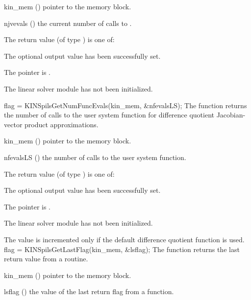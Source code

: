 {
  \begin{args}
  \item[kin\_mem] ()
    pointer to the {\kinsol} memory block.
  \item[njvevals] ()
    the current number of calls to .
  \end{args}
}
{
  The return value  (of type ) is one of:
  \begin{args}
  \item[\Id{KINSPILS\_SUCCESS}] 
    The optional output value has been successfully set.
  \item[\Id{KINSPILS\_MEM\_NULL}]
    The  pointer is .
  \item[\Id{KINSPILS\_LMEM\_NULL}]
    The linear solver module has not been initialized.
  \end{args}
}
{}
{
  flag = KINSpilsGetNumFuncEvals(kin\_mem, \&nfevalsLS);
}
{
  The function  returns the
  number of calls to the user system function for
  difference quotient Jacobian-vector product approximations.
}
{
  \begin{args}
  \item[kin\_mem] ()
    pointer to the {\kinsol} memory block.
  \item[nfevalsLS] ()
    the number of calls to the user system function.
  \end{args}
}
{
  The return value  (of type ) is one of:
  \begin{args}
  \item[\Id{KINSPILS\_SUCCESS}] 
    The optional output value has been successfully set.
  \item[\Id{KINSPILS\_MEM\_NULL}]
    The  pointer is .
  \item[\Id{KINSPILS\_LMEM\_NULL}]
    The linear solver module has not been initialized.
  \end{args}
}
{
  The value  is incremented only if the default 
   difference quotient function is used.
}
{
  flag = KINSpilsGetLastFlag(kin\_mem, \&lsflag);
}
{
  The function  returns the
  last return value from a {\kinspils} routine. 
}
{
  \begin{args}
  \item[kin\_mem] ()
    pointer to the {\kinsol} memory block.
  \item[lsflag] ()
    the value of the last return flag from a {\kinspils} function.
  \end{args}
}
